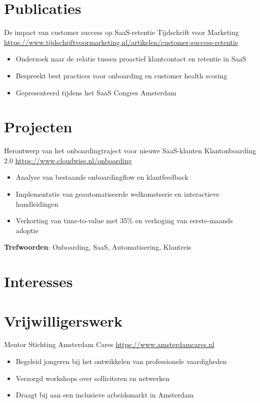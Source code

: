 \documentclass[a4paper, serif, 10pt]{moderncv}
\begin{document}
\section{Publicaties}

        {De impact van customer success op SaaS-retentie}
        {Tijdschrift voor Marketing}
        {\url{https://www.tijdschriftvoormarketing.nl/artikelen/customer-success-retentie}}
        {}
        {\begin{itemize}
\item Onderzoek naar de relatie tussen proactief klantcontact en retentie in SaaS
\item Bespreekt best practices voor onboarding en customer health scoring
\item Gepresenteerd tijdens het SaaS Congres Amsterdam
\end{itemize}}
\section{Projecten}

        {Herontwerp van het onboardingtraject voor nieuwe SaaS-klanten}
        {Klantonboarding 2.0}
        {\url{https://www.cloudwise.nl/onboarding}}
        {}
        {\begin{itemize}
\item Analyse van bestaande onboardingflow en klantfeedback
\item Implementatie van geautomatiseerde welkomstserie en interactieve handleidingen
\item Verkorting van time-to-value met 35\% en verhoging van eerste-maands adoptie
\end{itemize}
\textbf{Trefwoorden}: Onboarding, SaaS, Automatisering, Klantreis}
\section{Interesses}

\section{Vrijwilligerswerk}

        {Mentor}
        {Stichting Amsterdam Cares}
        {\url{https://www.amsterdamcares.nl}}
        {}
        {\begin{itemize}
\item Begeleid jongeren bij het ontwikkelen van professionele vaardigheden
\item Verzorgd workshops over solliciteren en netwerken
\item Draagt bij aan een inclusieve arbeidsmarkt in Amsterdam
\end{itemize}}
    
\end{document}
